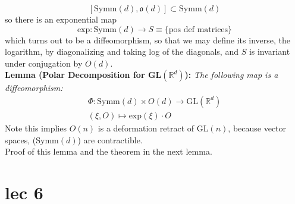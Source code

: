 \documentclass[12pt]{report}
\theoremstyle{definition}
\theoremstyle{remark}
\numberwithin{equation}{section}
\theoremstyle{definition}
\newcommand{\bb}[1]{\mathbb{#1}}
\begin{document}
$$
	[\text{Symm}(d), \mathfrak{o}(d)] \subset \text{Symm}(d)
$$ 
so there is an exponential map 
$$
	\text{exp}: \text{Symm}(d) \to S \equiv \{\text{pos def matrices}\}
$$
which turns out to be a diffeomorphism, so that we may define its inverse, the logarithm, by diagonalizing and taking log of the diagonals, and $S$ is invariant under conjugation by $O(d)$. \\
\textbf{Lemma (Polar Decomposition for GL$(\bb R^d)$):}\textit{ The following map is a diffeomorphism: }
\begin{gather*}
	\Phi: \text{Symm}(d) \times O(d) \to \text{GL}(\bb R^d)\\
(\xi, O) \mapsto \text{exp}(\xi)\cdot O
\end{gather*}
Note this implies $O(n)$ is a deformation retract of GL$(n)$, because vector spaces, (Symm$(d)$) are contractible. \\
Proof of this lemma and the theorem in the next lemma. 
\chapter{lec 6}
\end{document}
